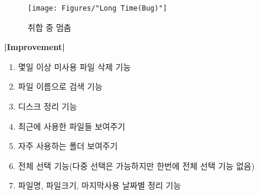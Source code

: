 \documentclass[a4paper, 13pt]{article} %
\begin{document}
		\begin{figure}[h]
			
			\centering
			
			\texttt{[image: Figures/"Long Time(Bug)"]}
			
			\caption{취합 중 멈춤}
			
			\label{fig:long-time}
			
		\end{figure}
		
		\newpage
		
		\bf \LARGE |Improvement| \newline
		
		\begin{enumerate}
		
		\large \item 몇일 이상 미사용 파일 삭제 기능 \newline
		
		\item 파일 이름으로 검색 기능 \newline
		
		\item 디스크 정리 기능 \newline
		
		\item 최근에 사용한 파일들 보여주기 \newline
		
		\item 자주 사용하는 폴더 보여주기 \newline
		
		\item 전체 선택 기능(다중 선택은 가능하지만 한번에 전체 선택 기능 없음) \newline
		
		\item 파일명, 파일크기, 마지막사용 날짜별 정리 기능
		\end{enumerate}
\end{document}
